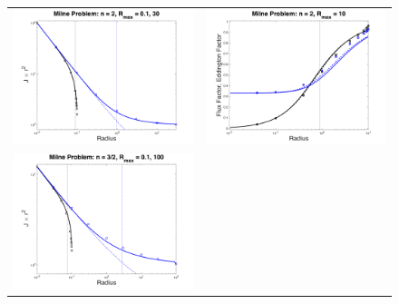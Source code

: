\documentclass[10pt,preprint]{aastex}
\begin{document}
\begin{figure}
  \begin{center}
    \begin{tabular}{cc}
      \includegraphics[scale=0.4]{./Figures/MilneProblem1D_n20.png} &
      \includegraphics[scale=0.4]{./Figures/MilneProblem1D_n20_EddingtonFactors.png} \\
      \includegraphics[scale=0.4]{./Figures/MilneProblem1D_n15.png} &

\end{tabular}
\end{center}
\end{figure}
\end{document}
